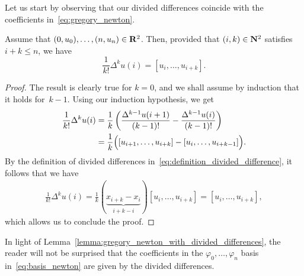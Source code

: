 Let us start by observing that our divided differences coincide
with the coefficients in~\eqref{eq:gregory_newton}.

\begin{lemma}
    \label{lemma:gregory_newton_with_divided_differences}
    Assume that $(0, u_0), \dotsc, (n, u_n) \in \mathbf R^2$.
    Then, provided that $(i, k) \in \mathbf N^2$ satisfies $i + k \leq n$,
    we have
    \[
        \frac 1 {k!} \Delta^k u(i) = [u_i, \dotsc, u_{i + k}].
    \]
\end{lemma}
\begin{proof}
    The result is clearly true for $k = 0$,
    and we shall assume by induction that it holds for~$k - 1$.
    Using our induction hypothesis, we get
    \begin{align*}
        \frac 1 {k!} \Delta^k u(i)
        &= \frac 1 k \left(\frac{\Delta^{k - 1} u(i + 1)}{(k - 1)!} - \frac{\Delta^{k - 1} u(i)} {(k - 1)!} \right)\\
        &= \frac 1 k \Bigl( [u_{i + 1}, \dotsc, u_{i + k}] - [u_i, \dotsc, u_{i + k - 1}] \Bigr).
    \end{align*}
    By the definition of divided differences in~\eqref{eq:definition_divided_difference},
    it follows that we have
    \begin{align*}
        \frac 1 {k!} \Delta^k u(i)
        = \frac 1 k (\underbrace{x_{i + k} - x_i}_{i + k - i}) [u_i, \dotsc, u_{i + k}]
        = [u_i, \dotsc, u_{i + k}],
    \end{align*}
    which allows us to conclude the proof.
\end{proof}

In light of Lemma~\ref{lemma:gregory_newton_with_divided_differences},
the reader will not be surprised that
the coefficients in the $\varphi_0, \dotsc, \varphi_n$ basis in~\eqref{eq:basis_newton}
are given by the divided differences.

